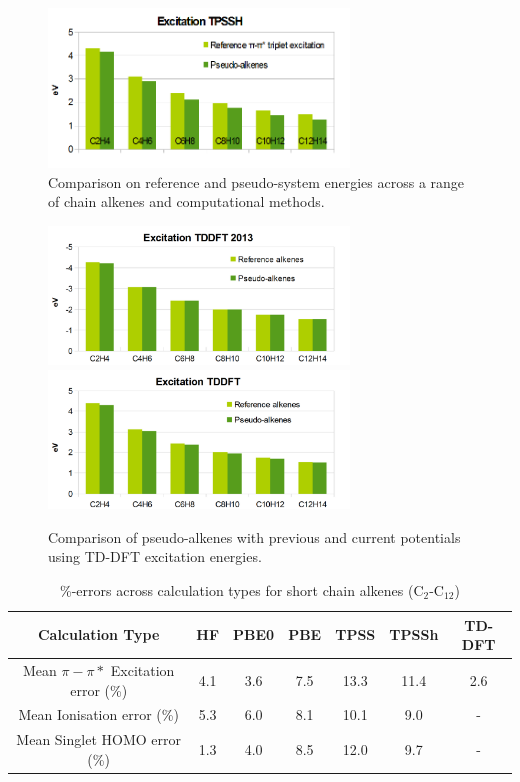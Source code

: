 \documentclass[journal=jctcce,manuscript=article]{achemso}
\begin{document}
\begin{figure}[h]
\includegraphics[width=8cm]{tpssh_excitation}
\caption{Comparison on reference and pseudo-system energies across a range of chain alkenes and computational methods.}
\label{fig:alkenes_hf_dft}
\end{figure}
\begin{figure}[h]
\includegraphics[width=8cm]{tddft_excitation_cd}
\includegraphics[width=8cm]{tddft_excitation}
\caption{Comparison of pseudo-alkenes with previous\cite{drujon_pseudopotentials_2013} and current potentials using TD-DFT excitation energies.}
\label{fig:alkenes_tddft}
\end{figure}

\begin{table}[h]
\caption{\%-errors across calculation types for short chain alkenes  (C\(_{2}\)-C\(_{12}\))}
\begin{tabular}{c c c c c c c}
\hline
Calculation Type & HF & PBE0 & PBE & TPSS & TPSSh & TD-DFT \\
\hline\hline
Mean \(\pi - \pi*\) Excitation error (\%) & 4.1 & 3.6 & 7.5 & 13.3 & 11.4 & 2.6 \\
Mean Ionisation error (\%) & 5.3 & 6.0 & 8.1 & 10.1 & 9.0 & - \\
Mean Singlet HOMO error (\%) & 1.3 & 4.0 & 8.5 & 12.0 & 9.7 & - \\
\hline
\end{tabular}
\label{table:alkene_errors}
\end{table}
\end{document}
